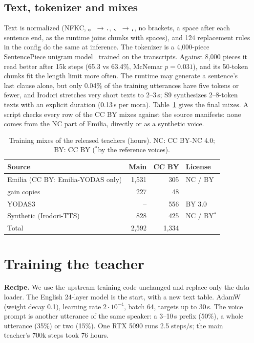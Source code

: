 \documentclass[10pt,a4paper,twocolumn]{article}
\begin{document}
\subsection{Text, tokenizer and mixes}
Text is normalized (NFKC, 。$\to$\texttt{.}, 、$\to$\texttt{,}, no brackets, a space after each
sentence end, as the runtime joins chunks with spaces), and 124 replacement rules in the config do the
same at inference. The tokenizer is a 4,000-piece SentencePiece unigram model~\cite{sentencepiece}
trained on the transcripts. Against 8,000 pieces it read better after 15k steps (65.3 vs 63.4\%,
McNemar $p=0.031$), and its 50-token chunks fit the length limit more often. The runtime may generate
a sentence's last clause alone, but only 0.04\% of the training utterances have five tokens or
fewer, and Irodori stretches very short texts to 2--3\,s; S9 synthesizes 2--8-token texts with an
explicit duration (0.13\,s per mora). Table~\ref{tab:mix} gives the final mixes. A script checks every
row of the CC BY mixes against the source manifests: none comes from the NC part of Emilia, directly
or as a synthetic voice.

\begin{table}[t]
\centering\footnotesize\setlength{\tabcolsep}{3pt}
\caption{Training mixes of the released teachers (hours). NC: CC BY-NC 4.0; BY: CC BY ($^\ast$by the
reference voices).}
\label{tab:mix}\setlength{\tabcolsep}{2.3pt}
\begin{tabular}{@{}lrrl@{}}
\toprule
Source & Main & CC BY & License\\
\midrule
Emilia (CC BY: Emilia-YODAS only) & 1,531 & 305 & NC / BY\\
\quad gain copies & 227 & 48 &\\
YODAS3 & -- & 556 & BY 3.0\\
Synthetic (Irodori-TTS) & 828 & 425 & NC / BY$^\ast$\\
\midrule
Total & 2,592 & 1,334 &\\
\bottomrule
\end{tabular}
\end{table}

\section{Training the teacher}\label{sec:train}
\textbf{Recipe.} We use the upstream training code unchanged and replace only the data loader. The
English 24-layer model is the start, with a new text table. AdamW (weight decay 0.1), learning rate
$2\cdot10^{-4}$, batch 64, targets up to 30\,s. The voice prompt is another utterance of the same
speaker: a 3--10\,s prefix (50\%), a whole utterance (35\%) or two (15\%). One RTX 5090 runs 2.5
steps/s; the main teacher's 700k steps took 76 hours.
\end{document}
